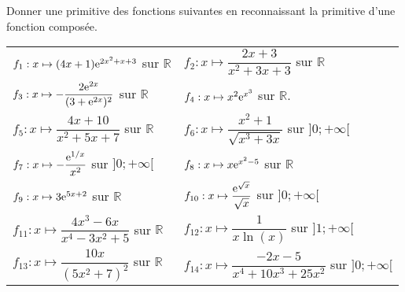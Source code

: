 \documentclass[11pt,fleqn, openany]{book} %
\begin{document}
\begin{exercise}Donner une primitive des fonctions suivantes en reconnaissant la primitive d'une fonction composée.


\renewcommand{\arraystretch}{2}
\begin{tabularx}{\linewidth}{XX}
 $f_1 : x\mapsto (4x+1)\mathrm{e}^{2x^2+x+3}$ sur $\mathbb{R}$
&
$f_2 :x\mapsto \dfrac{2x+3}{x^2+3x+3}$ sur $\mathbb{R}$
\\
$f_3:x\mapsto -\dfrac{2\mathrm{e}^{2x}}{(3+\mathrm{e}^{2x})^2}$ sur $\mathbb{R}$
&
 $f_4:x \mapsto x^2\mathrm{e}^{x^3}$ sur $\mathbb{R}$.
\\
$f_5:x \mapsto \dfrac{4x+10}{x^2+5x+7}$ sur $\mathbb{R}$
&
$f_6:x\mapsto \dfrac{x^2+1}{\sqrt{x^3+3x}}$ sur $]0;+\infty [$
\\
 $f_7:x \mapsto -\dfrac{\mathrm{e}^{1/x}}{x^2}$ sur $]0;+\infty[$
&
 $f_8:x\mapsto x\mathrm{e}^{x^2-5}$ sur $\mathbb{R}$
\\
 $f_9:x\mapsto 3\mathrm{e}^{5x+2}$ sur $\mathbb{R}$
&
$f_{10}:x \mapsto \dfrac{\mathrm{e}^{\sqrt{x}}}{\sqrt{x}}$ sur $]0;+\infty[$
\\
 $f_{11}:x\mapsto \dfrac{4x^3-6x}{x^4-3x^2+5}$ sur $\mathbb{R}$
 &
 $f_{12}:x\mapsto \dfrac{1}{x\ln(x)}$ sur $]1;+\infty[$ 
 \\
 $f_{13} : x \mapsto \dfrac{10x}{(5x^2+7)^2}$ sur $\mathbb{R}$ 
 &
 $f_{14}:x \mapsto \dfrac{-2x-5}{x^4+10x^3+25x^2}$ sur $]0;+\infty[$
 
\end{tabularx}
\newpage
\end{exercise}
\end{document}
